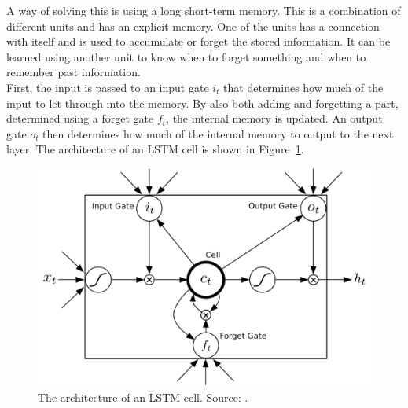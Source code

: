A way of solving this is using a long short-term memory. This is a combination of different units and has an explicit memory. One of the units has a connection with itself and is used to accumulate or forget the stored information. It can be learned using another unit to know when to forget something and when to remember past information.\\
First, the input is passed to an input gate $i_t$ that determines how much of the input to let through into the memory. By also both adding and forgetting a part, determined using a forget gate $f_t$, the internal memory is updated. An output gate $o_t$ then determines how much of the internal memory to output to the next layer.
The architecture of an LSTM cell is shown in Figure~\ref{fig:lstm}.
\begin{figure}[htb]
    \centering
    \includegraphics[width=.8\linewidth]{images/lstm.png}
    \caption[Long short-term memory cell]{The architecture of an LSTM cell. Source: \cite{journals/corr/Graves13}.}
    \label{fig:lstm}
\end{figure}
\\

